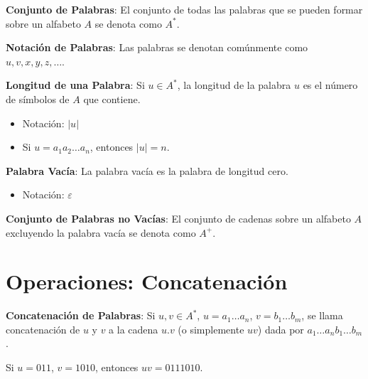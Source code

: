 \documentclass[12pt]{report} %
\begin{document}
\begin{definicion}
\textbf{Conjunto de Palabras}: El conjunto de todas las palabras que se pueden formar sobre un alfabeto $A$ se denota como $A^*$.  
\end{definicion}

\begin{definicion}
\textbf{Notación de Palabras}: Las palabras se denotan comúnmente como $u, v, x, y, z, \ldots$.  
\end{definicion}

\begin{definicion}
\textbf{Longitud de una Palabra}: Si $u \in A^*$, la longitud de la palabra $u$ es el número de símbolos de $A$ que contiene.  
\begin{itemize}
    \item Notación: $\lvert u \rvert$  
    \item Si $u = a_1 a_2 \ldots a_n$, entonces $\lvert u \rvert = n$.  
\end{itemize}
\end{definicion}

\begin{definicion}
\textbf{Palabra Vacía}: La palabra vacía es la palabra de longitud cero.  
\begin{itemize}
    \item Notación: $\varepsilon$  
\end{itemize}
\end{definicion}

\begin{definicion}
\textbf{Conjunto de Palabras no Vacías}: El conjunto de cadenas sobre un alfabeto $A$ excluyendo la palabra vacía se denota como $A^+$.  
\end{definicion}

\hypertarget{operaciones-concatenaciuxf3n}{%
\section{Operaciones:
Concatenación}\label{operaciones-concatenaciuxf3n}}

\begin{definicion}
\textbf{Concatenación de Palabras}: Si $u, v \in A^*$, $u = a_1 \ldots a_n$, $v = b_1 \ldots b_m$, se llama concatenación de $u$ y $v$ a la cadena $u.v$ (o simplemente $uv$) dada por $a_1 \ldots a_n b_1 \ldots b_m$.
\end{definicion}

\begin{ejemplo}
Si $u = 011$, $v = 1010$, entonces $uv = 0111010$.
\end{ejemplo}
\end{document}
